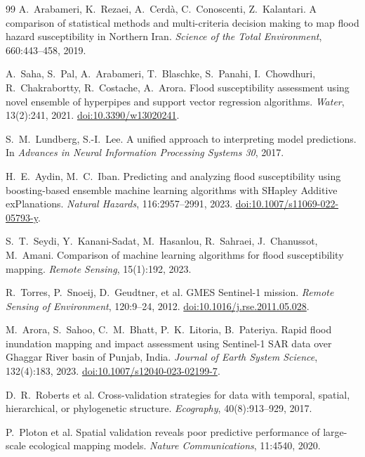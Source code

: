 \documentclass[10pt,twocolumn]{article}
\begin{document}
{\begin{thebibliography}{99}
A.~Arabameri, K.~Rezaei, A.~Cerd\`a, C.~Conoscenti, Z.~Kalantari.
A comparison of statistical methods and multi-criteria decision making to map
flood hazard susceptibility in Northern Iran.
\emph{Science of the Total Environment}, 660:443--458, 2019.

A.~Saha, S.~Pal, A.~Arabameri, T.~Blaschke, S.~Panahi, I.~Chowdhuri,
R.~Chakrabortty, R.~Costache, A.~Arora.
Flood susceptibility assessment using novel ensemble of hyperpipes and support
vector regression algorithms.
\emph{Water}, 13(2):241, 2021.
\href{https://doi.org/10.3390/w13020241}{doi:10.3390/w13020241}.

S.~M.~Lundberg, S.-I.~Lee.
A unified approach to interpreting model predictions.
In \emph{Advances in Neural Information Processing Systems 30}, 2017.

H.~E.~Aydin, M.~C.~Iban.
Predicting and analyzing flood susceptibility using boosting-based ensemble
machine learning algorithms with SHapley Additive exPlanations.
\emph{Natural Hazards}, 116:2957--2991, 2023.
\href{https://doi.org/10.1007/s11069-022-05793-y}{doi:10.1007/s11069-022-05793-y}.

S.~T.~Seydi, Y.~Kanani-Sadat, M.~Hasanlou, R.~Sahraei, J.~Chanussot,
M.~Amani.
Comparison of machine learning algorithms for flood susceptibility mapping.
\emph{Remote Sensing}, 15(1):192, 2023.

R.~Torres, P.~Snoeij, D.~Geudtner, et al.
GMES Sentinel-1 mission.
\emph{Remote Sensing of Environment}, 120:9--24, 2012.
\href{https://doi.org/10.1016/j.rse.2011.05.028}{doi:10.1016/j.rse.2011.05.028}.

M.~Arora, S.~Sahoo, C.~M.~Bhatt, P.~K.~Litoria, B.~Pateriya.
Rapid flood inundation mapping and impact assessment using Sentinel-1 SAR data
over Ghaggar River basin of Punjab, India.
\emph{Journal of Earth System Science}, 132(4):183, 2023.
\href{https://doi.org/10.1007/s12040-023-02199-7}{doi:10.1007/s12040-023-02199-7}.

D.~R.~Roberts et al.
Cross-validation strategies for data with temporal, spatial, hierarchical, or
phylogenetic structure.
\emph{Ecography}, 40(8):913--929, 2017.

P.~Ploton et al.
Spatial validation reveals poor predictive performance of large-scale ecological
mapping models.
\emph{Nature Communications}, 11:4540, 2020.


\end{thebibliography}}
\end{document}
